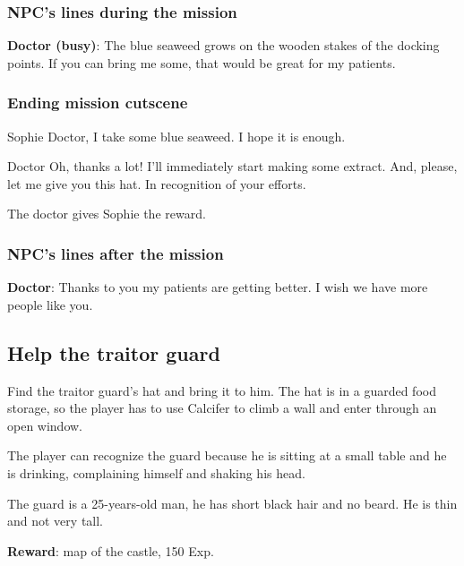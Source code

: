 \subsubsection*{NPC's lines during the mission}
\textbf{Doctor (busy)}: The blue seaweed grows on the wooden stakes of the docking points. If you can bring me some, that would be great for my patients.

\subsubsection*{Ending mission cutscene}
\begin{screenplay}

\begin{dialogue}{Sophie}
Doctor, I take some blue seaweed. I hope it is enough.
\end{dialogue}

\begin{dialogue}{Doctor}
Oh, thanks a lot! I'll immediately start making some extract. And, please, let me give you this hat. In recognition of your efforts.
\end{dialogue}

The doctor gives Sophie the reward.

\end{screenplay}

\subsubsection*{NPC's lines after the mission}
\textbf{Doctor}: Thanks to you my patients are getting better. I wish we have more people like you.


\subsection{Help the traitor guard}
Find the traitor guard's hat and bring it to him. The hat is in a guarded food storage, so the player has to use Calcifer to climb a wall and enter through an open window.

The player can recognize the guard because he is sitting at a small table and he is drinking, complaining himself and shaking his head.

The guard is a 25-years-old man, he has short black hair and no beard. He is thin and not very tall.

\textbf{Reward}: map of the castle, 150 Exp.

